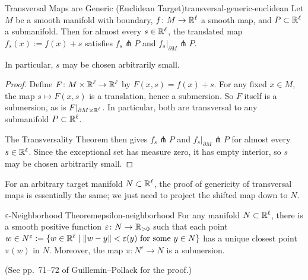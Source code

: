 \begin{corollary}{Transversal Maps are Generic (Euclidean Target)}{transversal-generic-euclidean}
    Let $M$ be a smooth manifold with boundary, $f \colon M \to \mathbb{R}^\ell$ a smooth map, and $P \subset \mathbb{R}^\ell$ a submanifold. Then for almost every $s \in \mathbb{R}^\ell$, the translated map $f_s(x) := f(x) + s$ satisfies $f_s \pitchfork P$ and $f_s|_{\partial M} \pitchfork P$.

    In particular, $s$ may be chosen arbitrarily small.
\end{corollary}

\begin{proof}
    Define $F \colon M \times \mathbb{R}^\ell \to \mathbb{R}^\ell$ by $F(x, s) = f(x) + s$. For any fixed $x \in M$, the map $s \mapsto F(x, s)$ is a translation, hence a submersion. So $F$ itself is a submersion, as is $F|_{\partial M \times \mathbb{R}^\ell}$. In particular, both are transversal to any submanifold $P \subset \mathbb{R}^\ell$.

    The Transversality Theorem then gives $f_s \pitchfork P$ and $f_s|_{\partial M} \pitchfork P$ for almost every $s \in \mathbb{R}^\ell$. Since the exceptional set has measure zero, it has empty interior, so $s$ may be chosen arbitrarily small.
\end{proof}

For an arbitrary target manifold $N \subset \mathbb{R}^\ell$, the proof of genericity of transversal maps is essentially the same; we just need to project the shifted map down to $N$.

\begin{lemma}{$\varepsilon$-Neighborhood Theorem}{epsilon-neighborhood}
    For any manifold $N \subset \mathbb{R}^\ell$, there is a smooth positive function $\varepsilon \colon N \to \mathbb{R}_{>0}$ such that each point $w \in N^\varepsilon := \{w \in \mathbb{R}^\ell \mid \|w - y\| < \varepsilon(y) \text{ for some } y \in N\}$ has a unique closest point $\pi(w)$ in $N$. Moreover, the map $\pi \colon N^\varepsilon \to N$ is a submersion.

    (See pp.~71--72 of Guillemin--Pollack for the proof.)
\end{lemma}

\begin{center}
\end{center}

